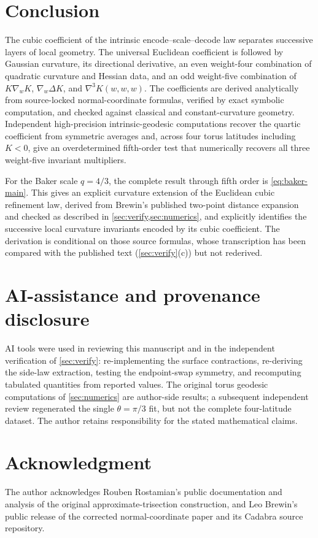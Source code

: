 \documentclass[11pt]{amsart}
\numberwithin{equation}{section}
\theoremstyle{remark}
\begin{document}
\section{Conclusion}

The cubic coefficient of the intrinsic encode--scale--decode law separates successive layers of local geometry.  The universal Euclidean coefficient is followed by Gaussian curvature, its directional derivative, an even weight-four combination of quadratic curvature and Hessian data, and an odd weight-five combination of $K\nabla_wK$, $\nabla_w\Delta K$, and $\nabla^3K(w,w,w)$.  The coefficients are derived analytically from source-locked normal-coordinate formulas, verified by exact symbolic computation, and checked against classical and constant-curvature geometry.  Independent high-precision intrinsic-geodesic computations recover the quartic coefficient from symmetric averages and, across four torus latitudes including $K<0$, give an overdetermined fifth-order test that numerically recovers all three weight-five invariant multipliers.

For the Baker scale $q=4/3$, the complete result through fifth order is \eqref{eq:baker-main}.  This gives an explicit curvature extension of the Euclidean cubic refinement law, derived from Brewin's published two-point distance expansion and checked as described in \cref{sec:verify,sec:numerics}, and explicitly identifies the successive local curvature invariants encoded by its cubic coefficient.  The derivation is conditional on those source formulas, whose transcription has been compared with the published text (\cref{sec:verify}(c)) but not rederived.

\section*{AI-assistance and provenance disclosure}
AI tools were used in reviewing this manuscript and in the independent verification of \cref{sec:verify}: re-implementing the surface contractions, re-deriving the side-law extraction, testing the endpoint-swap symmetry, and recomputing tabulated quantities from reported values. The original torus geodesic computations of \cref{sec:numerics} are author-side results; a subsequent independent review regenerated the single $\theta=\pi/3$ fit, but not the complete four-latitude dataset. The author retains responsibility for the stated mathematical claims.

\section*{Acknowledgment}
The author acknowledges Rouben Rostamian's public documentation and analysis of the original approximate-trisection construction, and Leo Brewin's public release of the corrected normal-coordinate paper and its Cadabra source repository.
\end{document}
